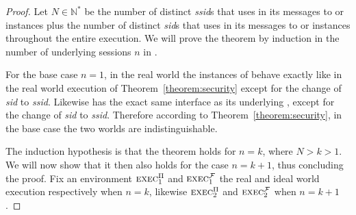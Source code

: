 \begin{proof}
  Let $N \in \mathbb{N}^*$ be the number of distinct \emph{ssid}s that
  \environment uses in its messages to \pchanhat or \fchanhat instances plus the
  number of distinct \emph{sid}s that \environment uses in its messages to
  \pchan or \fchan instances throughout the entire execution. We will prove the
  theorem by induction in the number of underlying sessions $n$ in \fchanhat.

  For the base case $n=1$, in the real world the instances of \pchanhat behave
  exactly like \pchan in the real world execution of
  Theorem~\ref{theorem:security} except for the change of \emph{sid} to
  \emph{ssid}. Likewise \fchanhat has the exact same interface as its underlying
  \fchan, except for the change of \emph{sid} to \emph{ssid}. Therefore
  according to Theorem~\ref{theorem:security}, in the base case the two worlds
  are indistinguishable.

  The induction hypothesis is that the theorem holds for $n = k$, where $N > k >
  1$. We will now show that it then also holds for the case $n = k + 1$, thus
  concluding the proof. Fix an environment $\textsc{exec}_1^{\Pi}$ and
  $\textsc{exec}_1^{\mathcal{F}}$ the real and ideal world execution
  respectively when $n = k$, likewise $\textsc{exec}_2^{\Pi}$ and
  $\textsc{exec}_2^{\mathcal{F}}$ when $n = k + 1$. 
\end{proof}
